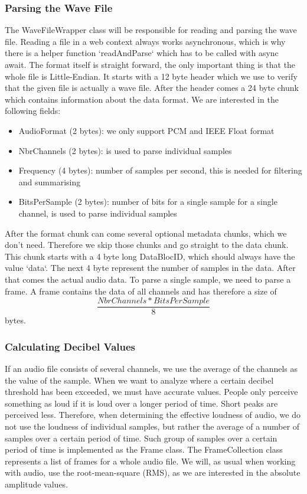 \subsubsection{Parsing the Wave File}
The WaveFileWrapper class will be responsible for reading and parsing the wave file.
Reading a file in a web context always works asynchronous, which is why there is a helper function `readAndParse` which has to be called with async await.
The format itself is straight forward\cite{wav_file_format_wikipedia}, the only important thing is that the whole file is Little-Endian.
It starts with a 12 byte header which we use to verify that the given file is actually a wave file.
After the header comes a 24 byte chunk which contains information about the data format.
We are interested in the following fields:
\begin{itemize}
    \item AudioFormat (2 bytes): we only support PCM and IEEE Float format
    \item NbrChannels (2 bytes): is used to parse individual samples
    \item Frequency (4 bytes): number of samples per second, this is needed for filtering and summarising
    \item BitsPerSample (2 bytes): number of bits for a single sample for a single channel, is used to parse individual samples
\end{itemize}
After the format chunk can come several optional metadata chunks, which we don't need. Therefore we skip those chunks and go straight to the data chunk.
This chunk starts with a 4 byte long DataBlocID, which should always have the value `data`.
The next 4 byte represent the number of samples in the data.
After that comes the actual audio data.
To parse a single sample, we need to parse a frame.
A frame contains the data of all channels and has therefore a size of \[\frac{NbrChannels * BitsPerSample}{8}\] bytes.

\subsubsection{Calculating Decibel Values}
If an audio file consists of several channels, we use the average of the channels as the value of the sample.
When we want to analyze where a certain decibel threshold has been exceeded, we must have accurate values.
People only perceive something as loud if it is loud over a longer period of time.
Short peaks are perceived less.
Therefore, when determining the effective loudness of audio, we do not use the loudness of individual samples,
but rather the average of a number of samples over a certain period of time.
Such group of samples over a certain period of time is implemented as the Frame class. The FrameCollection class represents
a list of frames for a whole audio file.
We will, as usual when working with audio, use the root-mean-square (RMS), as we are interested in the absolute amplitude values.

